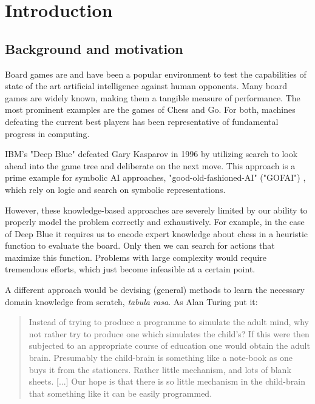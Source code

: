 \chapter{Introduction}

\section{Background and motivation}
Board games are and have been a popular environment to test the capabilities of state of the art artificial intelligence against human opponents. Many board games are widely known, making them a tangible measure of performance. The most prominent examples are the games of Chess and Go. For both, machines defeating the current best players has been representative of fundamental progress in computing.

IBM's "Deep Blue" defeated Gary Kasparov in 1996 \cite{higgins_brief_2017} by utilizing search to look ahead into the game tree and deliberate on the next move. This approach is a prime example for symbolic AI approaches, "good-old-fashioned-AI" ("GOFAI") \cite[p. 112f]{haugeland_artificial_1985}, which rely on logic and search on symbolic representations.

However, these knowledge-based approaches are severely limited by our ability to properly model the problem correctly and exhaustively. For example, in the case of Deep Blue it requires us to encode expert knowledge about chess in a heuristic function to evaluate the board. Only then we can search for actions that maximize this function. Problems with large complexity would require tremendous efforts, which just become infeasible at a certain point.

A different approach would be devising (general) methods to learn the necessary domain knowledge from scratch,  \emph{tabula rasa}. As Alan Turing put it:

\begin{quote}
    Instead of trying to produce a programme to simulate the adult mind, why not rather try to produce one which simulates the child’s? If this were then subjected to an appropriate course of education one would obtain the adult brain. Presumably the child-brain is something like a note-book as one buys it from the stationers. Rather little mechanism, and lots of blank sheets. [...] Our hope is that there is so little mechanism in the child-brain that something like it can be easily programmed.
    \cite{turing_icomputing_1950}
\end{quote}

